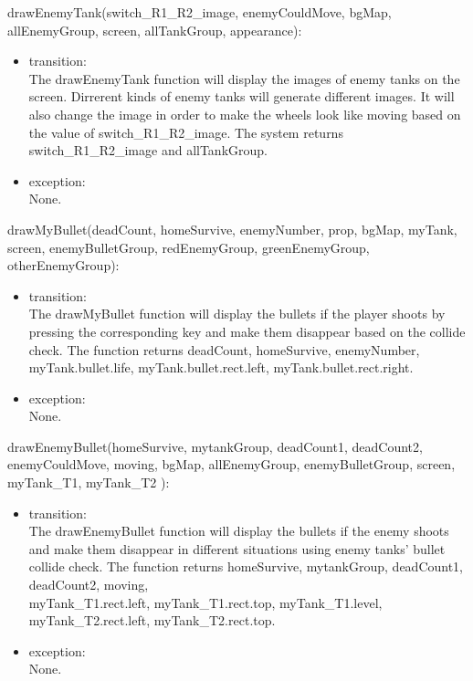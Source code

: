 \documentclass[12pt, titlepage]{article}
\begin{document}
	    drawEnemyTank(switch\_R1\_R2\_image, enemyCouldMove, bgMap, allEnemyGroup, screen, allTankGroup, appearance):
	    
	    \begin{itemize}
	    \item transition:\\
	    The drawEnemyTank function will display the images of enemy tanks on the screen. Dirrerent kinds of enemy tanks will generate different images. It will also change the image in order to make the wheels look like moving based on the value of switch\_R1\_R2\_image. The system returns switch\_R1\_R2\_image and allTankGroup.\\
	    
	    \item exception:\\ None.
	    \end{itemize}
	    
	    drawMyBullet(deadCount, homeSurvive, enemyNumber, prop, bgMap, myTank, screen, enemyBulletGroup, redEnemyGroup, greenEnemyGroup, otherEnemyGroup): 
	    \begin{itemize}
	    \item transition:\\
	    The drawMyBullet function will display the bullets if the player shoots by pressing the corresponding key and make them disappear based on the collide check. The function returns deadCount, homeSurvive, enemyNumber, myTank.bullet.life, myTank.bullet.rect.left, myTank.bullet.rect.right. \\
	    
	    \item exception:\\ None.
	    \end{itemize}
	    
	    drawEnemyBullet(homeSurvive, mytankGroup, deadCount1, deadCount2, enemyCouldMove, moving, bgMap, allEnemyGroup, enemyBulletGroup, screen, myTank\_T1, myTank\_T2 ):
	    \begin{itemize}
	    \item transition:\\
	    The drawEnemyBullet function will display the bullets if the enemy shoots and make them disappear in different situations using enemy tanks' bullet collide check. The function returns homeSurvive, mytankGroup, deadCount1, deadCount2, moving,\\ myTank\_T1.rect.left, myTank\_T1.rect.top, myTank\_T1.level, \\myTank\_T2.rect.left, myTank\_T2.rect.top. \\
	    
	    \item exception:\\ None.
	    \end{itemize}
	    
\end{document}
